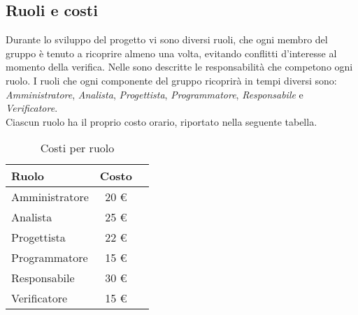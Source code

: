	\subsection{Ruoli e costi}
	
	Durante lo sviluppo del progetto vi sono diversi ruoli, che ogni membro del gruppo \GroupName{} è tenuto a ricoprire almeno una volta, evitando conflitti d'interesse al momento della verifica. Nelle \NormeDiProgetto{} sono descritte le responsabilità che competono ogni ruolo. I ruoli che ogni componente del gruppo ricoprirà in tempi diversi sono: \textit{Amministratore}, \textit{Analista}, \textit{Progettista}, \textit{Programmatore}, \textit{Responsabile} e \textit{Verificatore}. \\
	Ciascun ruolo ha il proprio costo orario, riportato nella seguente tabella.
	\label{tabellacostiruolo}
	\begin{table}[h]
	\centering
	\begin{tabular}{ l c l }
	\hline
	\textbf{Ruolo} & \textbf{Costo} \\
	\hline
	Amministratore & 20 € \\
	Analista & 25 € \\
	Progettista & 22 € \\
	Programmatore & 15 € \\
	Responsabile & 30 € \\
	Verificatore & 15 €\\
	\hline
	\end{tabular}
	\caption{Costi per ruolo}
	\end{table}


